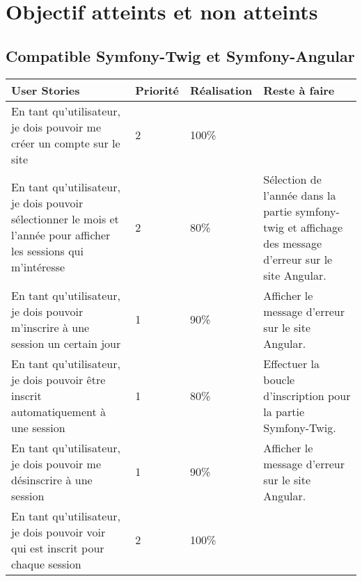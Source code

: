 \section{Objectif atteints et non atteints}
	\subsection{Compatible Symfony-Twig et Symfony-Angular}
		\begin{center}
			\begin{tabularx}{\textwidth}{|Y|T{0.1\textwidth}|T{0.15\textwidth}|Y|}
				\hline
				User Stories & Priorité & Réalisation & Reste à faire \\
				\hline	
				En tant qu’utilisateur, je dois pouvoir me créer un compte sur le site & 2 & 100\% & \\
				\hline
				En tant qu'utilisateur, je dois pouvoir sélectionner le mois et l'année pour afficher les sessions qui m'intéresse & 2 & 80\% & Sélection de l'année dans la partie symfony-twig et affichage des message d'erreur sur le site Angular. \\
				\hline
				En tant qu’utilisateur, je dois pouvoir m’inscrire à une session un certain jour & 1 & 90\% & Afficher le message d'erreur sur le site Angular.\\
				\hline
				En tant qu’utilisateur, je dois pouvoir être inscrit automatiquement à une session & 1 & 80\% & Effectuer la boucle d'inscription pour la partie Symfony-Twig.  \\
				\hline
				En tant qu’utilisateur, je dois pouvoir me désinscrire à une session & 1 & 90\% & Afficher le message d'erreur sur le site Angular.\\
				\hline
				En tant qu’utilisateur, je dois pouvoir voir qui est inscrit pour chaque session & 2 & 100\% & \\
				\hline
			\end{tabularx}
		\end{center}
	
